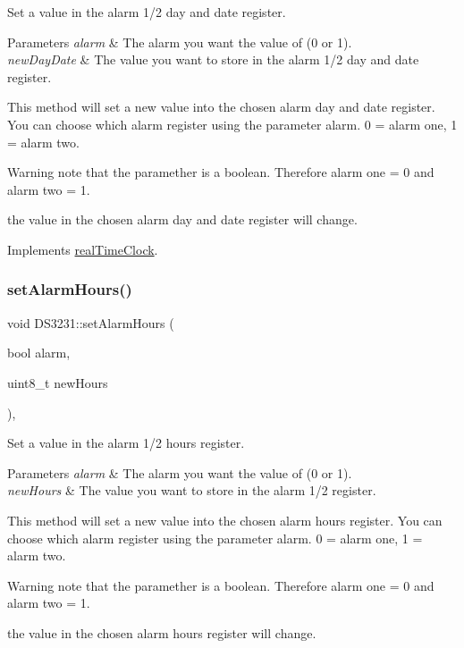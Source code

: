 Set a value in the alarm 1/2 day and date register. 


\begin{DoxyParams}{Parameters}
{\em alarm} & The alarm you want the value of (0 or 1). \\
\hline
{\em new\+Day\+Date} & The value you want to store in the alarm 1/2 day and date register.\\
\hline
\end{DoxyParams}
This method will set a new value into the chosen alarm day and date register. You can choose which alarm register using the parameter alarm. 0 = alarm one, 1 = alarm two. \begin{DoxyWarning}{Warning}
note that the paramether is a boolean. Therefore alarm one = 0 and alarm two = 1. 

the value in the chosen alarm day and date register will change. 
\end{DoxyWarning}


Implements \mbox{\hyperlink{classreal_time_clock_a2c2bb16a7fc59f463fb3aaed2fcd1926}{real\+Time\+Clock}}.

\mbox{\label{class_d_s3231_a0bcc7e2285869ffbe29d19c593f5a447}} 
\subsubsection{\texorpdfstring{set\+Alarm\+Hours()}{setAlarmHours()}}
{\footnotesize\ttfamily void D\+S3231\+::set\+Alarm\+Hours (\begin{DoxyParamCaption}\item[{bool}]{alarm,  }\item[{uint8\+\_\+t}]{new\+Hours }\end{DoxyParamCaption})\hspace{0.3cm}{\ttfamily [override]}, {\ttfamily [virtual]}}



Set a value in the alarm 1/2 hours register. 


\begin{DoxyParams}{Parameters}
{\em alarm} & The alarm you want the value of (0 or 1). \\
\hline
{\em new\+Hours} & The value you want to store in the alarm 1/2 register.\\
\hline
\end{DoxyParams}
This method will set a new value into the chosen alarm hours register. You can choose which alarm register using the parameter alarm. 0 = alarm one, 1 = alarm two. \begin{DoxyWarning}{Warning}
note that the paramether is a boolean. Therefore alarm one = 0 and alarm two = 1. 

the value in the chosen alarm hours register will change. 
\end{DoxyWarning}


